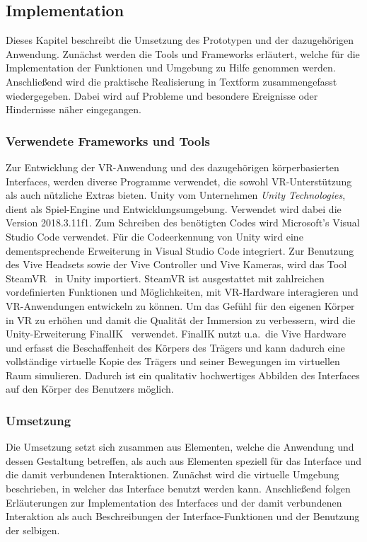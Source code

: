 \subsection{Implementation}
Dieses Kapitel beschreibt die Umsetzung des Prototypen und der dazugehörigen Anwendung. Zunächst werden die Tools und Frameworks erläutert, welche für die Implementation der Funktionen und Umgebung zu Hilfe genommen werden. Anschließend wird die praktische Realisierung in Textform zusammengefasst wiedergegeben. Dabei wird auf Probleme und besondere Ereignisse oder Hindernisse näher eingegangen.

\subsubsection{Verwendete Frameworks und Tools}
Zur Entwicklung der VR-Anwendung und des dazugehörigen körperbasierten Interfaces, werden diverse Programme verwendet, die sowohl VR-Unterstützung als auch nützliche Extras bieten. Unity vom Unternehmen \textit{Unity Technologies}, dient als Spiel-Engine und Entwicklungsumgebung. Verwendet wird dabei die Version 2018.3.11f1. Zum Schreiben des benötigten Codes wird Microsoft's Visual Studio Code verwendet. Für die Codeerkennung von Unity wird eine dementsprechende Erweiterung in Visual Studio Code integriert. Zur Benutzung des Vive Headsets sowie der Vive Controller und Vive Kameras, wird das Tool SteamVR~\citep{steamvr} in Unity importiert. SteamVR ist ausgestattet mit zahlreichen vordefinierten Funktionen und Möglichkeiten, mit VR-Hardware interagieren und VR-Anwendungen entwickeln zu können. Um das Gefühl für den eigenen Körper in VR zu erhöhen und damit die Qualität der Immersion zu verbessern, wird die Unity-Erweiterung FinalIK~\citep{finalik} verwendet. FinalIK nutzt u.a.~die Vive Hardware und erfasst die Beschaffenheit des Körpers des Trägers und kann dadurch eine vollständige virtuelle Kopie des Trägers und seiner Bewegungen im virtuellen Raum simulieren. Dadurch ist ein qualitativ hochwertiges Abbilden des Interfaces auf den Körper des Benutzers möglich.

\subsubsection{Umsetzung}
Die Umsetzung setzt sich zusammen aus Elementen, welche die Anwendung und dessen Gestaltung betreffen, als auch aus Elementen speziell für das Interface und die damit verbundenen Interaktionen. Zunächst wird die virtuelle Umgebung beschrieben, in welcher das Interface benutzt werden kann. Anschließend folgen Erläuterungen zur Implementation des Interfaces und der damit verbundenen Interaktion als auch Beschreibungen der Interface-Funktionen und der Benutzung der selbigen.\\

